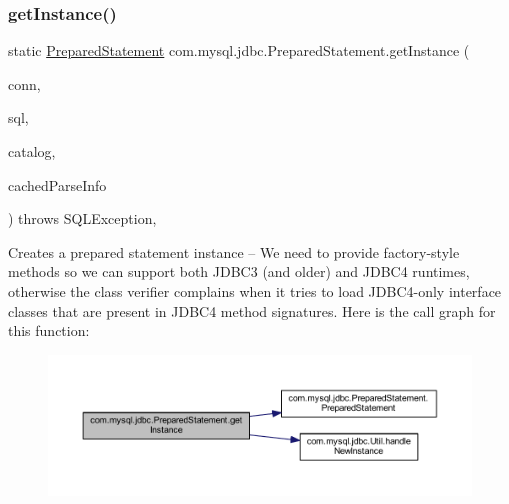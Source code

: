 \subsubsection{\texorpdfstring{get\+Instance()}{getInstance()}\hspace{0.1cm}{\footnotesize\ttfamily [3/3]}}
{\footnotesize\ttfamily static \mbox{\hyperlink{classcom_1_1mysql_1_1jdbc_1_1_prepared_statement}{Prepared\+Statement}} com.\+mysql.\+jdbc.\+Prepared\+Statement.\+get\+Instance (\begin{DoxyParamCaption}\item[{\mbox{\hyperlink{interfacecom_1_1mysql_1_1jdbc_1_1_my_s_q_l_connection}{My\+S\+Q\+L\+Connection}}}]{conn,  }\item[{String}]{sql,  }\item[{String}]{catalog,  }\item[{Parse\+Info}]{cached\+Parse\+Info }\end{DoxyParamCaption}) throws S\+Q\+L\+Exception\hspace{0.3cm}{\ttfamily [static]}, {\ttfamily [protected]}}

Creates a prepared statement instance -- We need to provide factory-\/style methods so we can support both J\+D\+B\+C3 (and older) and J\+D\+B\+C4 runtimes, otherwise the class verifier complains when it tries to load J\+D\+B\+C4-\/only interface classes that are present in J\+D\+B\+C4 method signatures. Here is the call graph for this function\+:
\nopagebreak
\begin{figure}[H]
\begin{center}
\leavevmode
\includegraphics[width=350pt]{classcom_1_1mysql_1_1jdbc_1_1_prepared_statement_a37bdcf9e02a649454447143c8b6361d7_cgraph}
\end{center}
\end{figure}
\mbox{\label{classcom_1_1mysql_1_1jdbc_1_1_prepared_statement_a260be2cc343e066802a49720c672da77}} 
